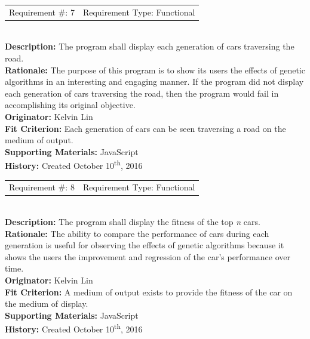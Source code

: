 \documentclass[12pt, titlepage]{article}
\begin{document}
\begin{reqbox}
	\begin{tabular}{cc}
		Requirement \#: 7 & Requirement Type: Functional \\
	\end{tabular} \\
	\textbf{Description:} The program shall display each generation of cars 
	traversing the road. \\
	\textbf{Rationale:} The purpose of this program is to show its users the 
effects 
	of genetic algorithms in an interesting and engaging manner. If the program did 
	not display each generation of cars traversing the road, then the program would 
	fail in accomplishing its original objective. \\
	\textbf{Originator:} Kelvin Lin\\
	\textbf{Fit Criterion:} Each generation of cars can be seen traversing a road 
on 
	the medium of output.\\
	\textbf{Supporting Materials:} JavaScript \\
	\textbf{History:} Created October 10\textsuperscript{th}, 2016
\end{reqbox}

\newpage

\begin{reqbox}
	\begin{tabular}{cc}
		Requirement \#: 8 & Requirement Type: Functional \\
	\end{tabular} \\
	\textbf{Description:} The program shall display the fitness of the top 
	\textit{n} cars. \\
	\textbf{Rationale:} The ability to compare the performance of cars during each 
	generation is useful for observing the effects of genetic algorithms because it 
	shows the users the improvement and regression of the car's performance over 
	time.\\
	\textbf{Originator:} Kelvin Lin\\
	\textbf{Fit Criterion:} A medium of output exists to provide the fitness of the 
	car on the medium of display.\\
	\textbf{Supporting Materials:} JavaScript \\
	\textbf{History:} Created October 10\textsuperscript{th}, 2016
\end{reqbox}
\end{document}
